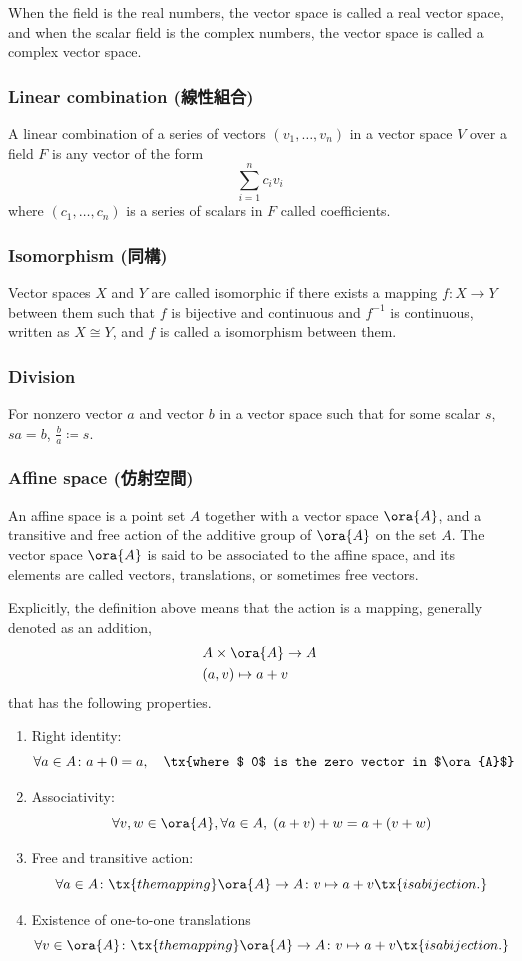 \documentclass[a4paper,12pt]{report}
\begin{document}
When the field is the real numbers, the vector space is called a real vector space, and when the scalar field is the complex numbers, the vector space is called a complex vector space.
\subsubsection{Linear combination (線性組合)}
A linear combination of a series of vectors $(v_1,\ldots,v_n)$ in a vector space $V$ over a field $F$ is any vector of the form
\[\sum_{i=1}^nc_iv_i\]
where $(c_1,\ldots,c_n)$ is a series of scalars in $F$ called coefficients.
\subsubsection{Isomorphism (同構)}
Vector spaces $X$ and $Y$ are called isomorphic if there exists a mapping $f\colon X\to Y$ between them such that $f$ is bijective and continuous and $f^{-1}$ is continuous, written as \( X \cong Y \), and $f$ is called a isomorphism between them.
\subsubsection{Division}
For nonzero vector $a$ and vector $b$ in a vector space such that for some scalar $s$, $sa=b$, $\frac{b}{a}\coloneq s$.
\subsubsection{Affine space (仿射空間)}
An affine space is a point set $A$ together with a vector space $\ora{A}$, and a transitive and free action of the additive group of $\ora{A}$ on the set $A$. The vector space $\ora{A}$ is said to be associated to the affine space, and its elements are called vectors, translations, or sometimes free vectors.

Explicitly, the definition above means that the action is a mapping, generally denoted as an addition,
\[\begin{aligned}
& A\times\ora{A}\to A\\
& (a,v)\mapsto a+v
\end{aligned}\]
that has the following properties.
\begin{enumerate}
\item Right identity: \[\forall a\in A\colon a+0=a,\quad\tx{where $ 0$ is the zero vector in $\ora{A}$}\]
\item Associativity: \[\forall v,w\in \ora{A},\forall a\in A,\;(a+v)+w=a+(v+w)\]
\item Free and transitive action: \[\forall a\in A\colon \tx{the mapping }\ora{A}\to A\colon v\mapsto a+v\tx{ is a bijection.}\]
\item Existence of one-to-one translations \[\forall v\in \ora{A} \colon \tx{the mapping }\ora{A}\to A\colon v\mapsto a+v\tx{ is a bijection.}\]
\end{enumerate}
\end{document}
